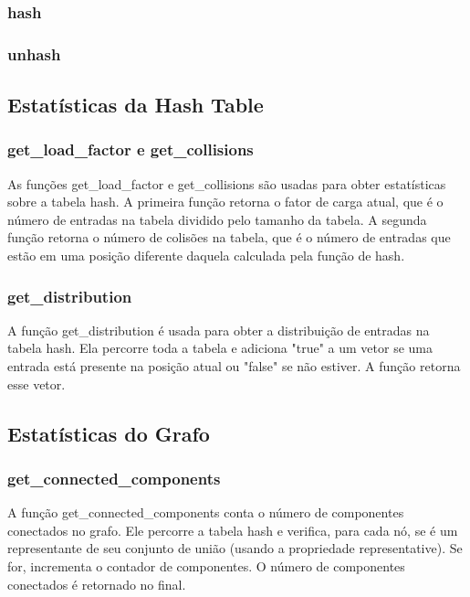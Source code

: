 \documentclass[a4paper,11pt]{article}
\begin{document}
    \subsubsection{hash}
    
    \subsubsection{unhash}


    \subsection{Estatísticas da Hash Table}\label{subsec:estatisticas-da-hash-table}

    \subsubsection{get\_load\_factor e get\_collisions}
   As funções get\_load\_factor e get\_collisions são usadas para obter estatísticas sobre a tabela hash. A primeira função retorna o fator de carga atual, que é o número de entradas na tabela dividido pelo tamanho da tabela. A segunda função retorna o número de colisões na tabela, que é o número de entradas que estão em uma posição diferente daquela calculada pela função de hash.
    
    \subsubsection{get\_distribution}
    A função get\_distribution é usada para obter a distribuição de entradas na tabela hash. Ela percorre toda a tabela e adiciona "true" a um vetor se uma entrada está presente na posição atual ou "false" se não estiver. A função retorna esse vetor.
    
    \subsection{Estatísticas do Grafo}\label{subsec:estatisticas-do-grafo}
    
    \subsubsection{get\_connected\_components}
    A função get\_connected\_components conta o número de componentes conectados no grafo. Ele percorre a tabela hash e verifica, para cada nó, se é um representante de seu conjunto de união (usando a propriedade representative). Se for, incrementa o contador de componentes. O número de componentes conectados é retornado no final.
    
\end{document}
